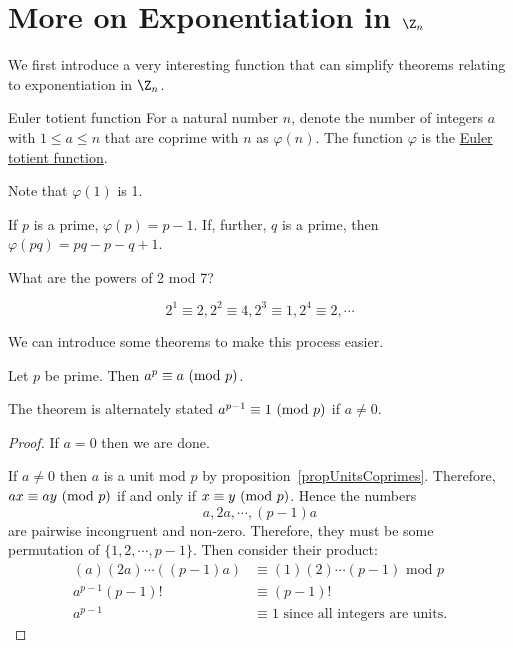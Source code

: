 \documentclass[../Main.tex]{subfiles}
\begin{document}
\section{More on Exponentiation in \texorpdfstring{$\Z_n$}{Zn}}
We first introduce a very interesting function that can simplify theorems relating to exponentiation in $\Z_n$.
\begin{definition}{Euler totient function}
    For a natural number $n$, denote the number of integers $a$ with $1 \leq a \leq n$ that are coprime with $n$ as $\varphi(n)$. The function $\varphi$ is the \underline{Euler totient function}.
\end{definition}
Note that $\varphi(1)$ is 1.\par
If $p$ is a prime, $\varphi(p) = p - 1$. If, further, $q$ is a prime, then $\varphi(pq) = pq - p - q + 1$.
\begin{example}
    What are the powers of 2 mod 7?\par
    \begin{equation*}
        2^1 \equiv 2, 2^2 \equiv 4, 2^3 \equiv 1, 2^4 \equiv 2, \cdots
    \end{equation*}
\end{example}
We can introduce some theorems to make this process easier.
\begin{theorem}
    Let $p$ be prime. Then $a^p \equiv a~(\text{mod}~{p})$.
    \label{thmFermatLittle}
\end{theorem}
The theorem is alternately stated $a^{p-1} \equiv 1~(\text{mod}~{p})$ if $a \neq 0$.
\begin{proof}
    If $a = 0$ then we are done.\par
    If $a \neq 0$ then $a$ is a unit mod $p$ by proposition~\ref{propUnitsCoprimes}. Therefore, $ax \equiv ay~(\text{mod}~{p})$ if and only if $x \equiv y~(\text{mod}~{p})$. Hence the numbers
    \begin{equation*}
        a, 2a, \cdots, (p-1)a
    \end{equation*}
    are pairwise incongruent and non-zero. Therefore, they must be some permutation of $\{1, 2, \cdots, p-1\}$. Then consider their product:
    \begin{align*}
        (a)(2a)\cdots((p-1)a) &\equiv (1)(2)\cdots(p-1)\text{ mod } p \\
        a^{p-1}(p-1)! &\equiv (p-1)! \\
        a^{p-1} &\equiv 1 \text{ since all integers are units.}
    \end{align*}
\end{proof}
\end{document}
